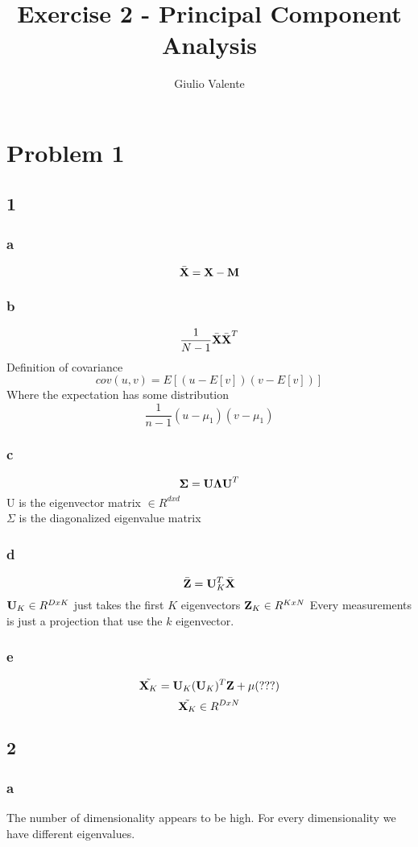 \documentclass{article}
\author{Giulio Valente}
\title{Exercise 2 - Principal Component Analysis}
\begin{document}
\date{}
\maketitle

\section{Problem 1}
\subsection{1}
\subsubsection{a}
$$\bar{\textbf X} = \textbf X - \textbf M$$

\subsubsection{b}
$$\frac{1}{N-1}\bar{\textbf X}\bar{\textbf X}^T$$
Definition of covariance
$$cov(u,v) = E[(u-E[v])(v-E[v])]$$
Where the expectation has some distribution
$$\frac{1}{n-1}(u-\mu_1)(v-\mu_1)$$

\subsubsection{c}
$$\boldsymbol\Sigma = \textbf U\boldsymbol\Lambda\textbf U^T$$
U is the eigenvector matrix $\in R^{dxd}$\\
$\Sigma$ is the diagonalized eigenvalue matrix

\subsubsection{d}
$$\bar{\textbf Z} =  \textbf U_K^T\bar{\textbf X}$$
$\textbf U_K \in R^{DxK}$ just takes the first $K$ eigenvectors
$\textbf Z_K \in R^{KxN}$ 
Every measurements is just a projection that use the $k$ eigenvector.
\subsubsection{e}
$$\tilde{\textbf X_K} = \textbf U_K(\textbf U_K)^T\textbf Z + \mu (???)$$
$$\tilde{\textbf X_K} \in R^{DxN}$$
\subsection{2}
\subsubsection{a}
The number of dimensionality appears to be high. For every dimensionality we have different eigenvalues.
\end{document}
